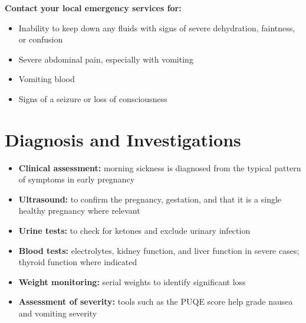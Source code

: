\textbf{Contact your local emergency services for:}
\begin{itemize}
    \item Inability to keep down any fluids with signs of severe dehydration, faintness, or confusion
    \item Severe abdominal pain, especially with vomiting
    \item Vomiting blood
    \item Signs of a seizure or loss of consciousness
\end{itemize}

\section*{Diagnosis and Investigations}
\begin{itemize}
    \item \textbf{Clinical assessment:} morning sickness is diagnosed from the typical pattern of symptoms in early pregnancy
    \item \textbf{Ultrasound:} to confirm the pregnancy, gestation, and that it is a single healthy pregnancy where relevant
    \item \textbf{Urine tests:} to check for ketones and exclude urinary infection
    \item \textbf{Blood tests:} electrolytes, kidney function, and liver function in severe cases; thyroid function where indicated
    \item \textbf{Weight monitoring:} serial weights to identify significant loss
    \item \textbf{Assessment of severity:} tools such as the PUQE score help grade nausea and vomiting severity
\end{itemize}

